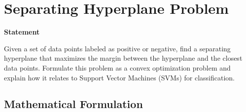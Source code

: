 \documentclass{article}
\begin{document}
\section*{Separating Hyperplane Problem}

\textbf{Statement}

Given a set of data points labeled as positive or negative, find a separating hyperplane that maximizes the margin between the hyperplane and the closest data points. Formulate this problem as a convex optimization problem and explain how it relates to Support Vector Machines (SVMs) for classification.

\subsection*{Mathematical Formulation}
\end{document}
